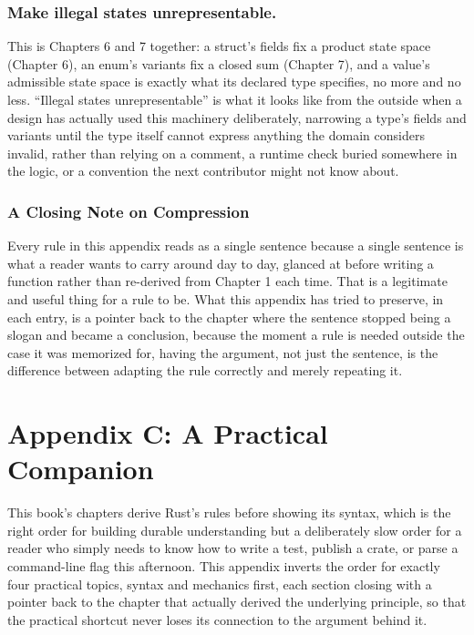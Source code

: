 \documentclass[11pt]{book}
\begin{document}
\subsection*{Make illegal states unrepresentable.}

This is Chapters 6 and 7 together: a struct's fields fix a product state space (Chapter 6), an enum's variants fix a closed sum (Chapter 7), and a value's admissible state space is exactly what its declared type specifies, no more and no less. ``Illegal states unrepresentable'' is what it looks like from the outside when a design has actually used this machinery deliberately, narrowing a type's fields and variants until the type itself cannot express anything the domain considers invalid, rather than relying on a comment, a runtime check buried somewhere in the logic, or a convention the next contributor might not know about.

\subsection*{A Closing Note on Compression}

Every rule in this appendix reads as a single sentence because a single sentence is what a reader wants to carry around day to day, glanced at before writing a function rather than re-derived from Chapter 1 each time. That is a legitimate and useful thing for a rule to be. What this appendix has tried to preserve, in each entry, is a pointer back to the chapter where the sentence stopped being a slogan and became a conclusion, because the moment a rule is needed outside the case it was memorized for, having the argument, not just the sentence, is the difference between adapting the rule correctly and merely repeating it.

\clearpage

\chapter[A Practical Companion]{Appendix C: A Practical Companion}

This book's chapters derive Rust's rules before showing its syntax, which is the right order for building durable understanding but a deliberately slow order for a reader who simply needs to know how to write a test, publish a crate, or parse a command-line flag this afternoon. This appendix inverts the order for exactly four practical topics, syntax and mechanics first, each section closing with a pointer back to the chapter that actually derived the underlying principle, so that the practical shortcut never loses its connection to the argument behind it.
\end{document}
